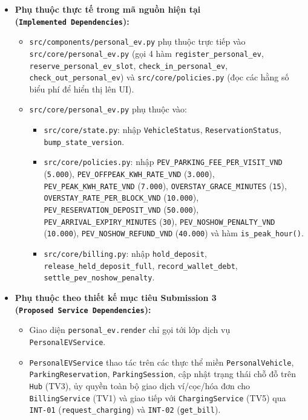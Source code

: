 \documentclass[11pt,a4paper]{article}
\providecommand{\tightlist}{%
  \setlength{\itemsep}{0pt}\setlength{\parskip}{0pt}}
\begin{document}
\begin{itemize}
\tightlist
\item
  \textbf{Phụ thuộc thực tế trong mã nguồn hiện tại
  (\texttt{Implemented\ Dependencies}):}

  \begin{itemize}
  \tightlist
  \item
    \texttt{src/components/personal\_ev.py} phụ thuộc trực tiếp vào
    \texttt{src/core/personal\_ev.py} (gọi 4 hàm
    \texttt{register\_personal\_ev},
    \texttt{reserve\_personal\_ev\_slot},
    \texttt{check\_in\_personal\_ev}, \texttt{check\_out\_personal\_ev})
    và \texttt{src/core/policies.py} (đọc các hằng số biểu phí để hiển
    thị lên UI).
  \item
    \texttt{src/core/personal\_ev.py} phụ thuộc vào:

    \begin{itemize}
    \tightlist
    \item
      \texttt{src/core/state.py}: nhập \texttt{VehicleStatus},
      \texttt{ReservationStatus}, \texttt{bump\_state\_version}.
    \item
      \texttt{src/core/policies.py}: nhập
      \texttt{PEV\_PARKING\_FEE\_PER\_VISIT\_VND} (\texttt{5.000}),
      \texttt{PEV\_OFFPEAK\_KWH\_RATE\_VND} (\texttt{3.000}),
      \texttt{PEV\_PEAK\_KWH\_RATE\_VND} (\texttt{7.000}),
      \texttt{OVERSTAY\_GRACE\_MINUTES} (\texttt{15}),
      \texttt{OVERSTAY\_RATE\_PER\_BLOCK\_VND} (\texttt{10.000}),
      \texttt{PEV\_RESERVATION\_DEPOSIT\_VND} (\texttt{50.000}),
      \texttt{PEV\_ARRIVAL\_EXPIRY\_MINUTES} (\texttt{30}),
      \texttt{PEV\_NOSHOW\_PENALTY\_VND} (\texttt{10.000}),
      \texttt{PEV\_NOSHOW\_REFUND\_VND} (\texttt{40.000}) và hàm
      \texttt{is\_peak\_hour()}.
    \item
      \texttt{src/core/billing.py}: nhập \texttt{hold\_deposit},
      \texttt{release\_held\_deposit\_full},
      \texttt{record\_wallet\_debt},
      \texttt{settle\_pev\_noshow\_penalty}.
    \end{itemize}
  \end{itemize}
\item
  \textbf{Phụ thuộc theo thiết kế mục tiêu Submission 3
  (\texttt{Proposed\ Service\ Dependencies}):}

  \begin{itemize}
  \tightlist
  \item
    Giao diện \texttt{personal\_ev.render} chỉ gọi tới lớp dịch vụ
    \texttt{PersonalEVService}.
  \item
    \texttt{PersonalEVService} thao tác trên các thực thể miền
    \texttt{PersonalVehicle}, \texttt{ParkingReservation},
    \texttt{ParkingSession}, cập nhật trạng thái chỗ đỗ trên
    \texttt{Hub} (TV3), ủy quyền toàn bộ giao dịch ví/cọc/hóa đơn cho
    \texttt{BillingService} (TV1) và giao tiếp với
    \texttt{ChargingService} (TV5) qua \texttt{INT-01}
    (\texttt{request\_charging}) và \texttt{INT-02}
    (\texttt{get\_bill}).
  \end{itemize}
\end{itemize}
\end{document}
